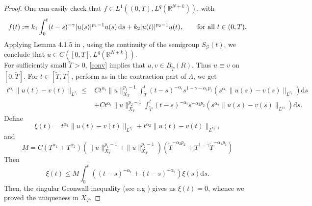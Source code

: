 \documentclass[a4,psfig,english,12pt,epsf,portrait]{article}
\numberwithin{equation}{section}
\def\R{{\mathbb {R}}}
\newcommand{\abs}[1]{\lvert#1\rvert}
\def\R{\mathbb{R}}
\begin{document}
\begin{proof}
	
	 One can easily check that $f\in L^1((0,T),L^q(\R^{N+k}))$, with
	$$f(t):=k_1 \int_0^t(t-s)^{-\gamma}\abs{u(s)}^{p_1-1}u(s) \, \mathrm{d}s  + k_2 |u(t)|^{p_2-1}u(t),\qquad \hbox{for all}\,\,t\in (0,T).$$
	Applying Lemma 4.1.5 in \cite{Caz-Hau-98}, using the continuity of the semigroup $S_{\mathcal{G}}(t)$,  we conclude that $u\in C([0,T],L^q(\R^{N+k}))$.\\
	
	 For sufficiently small $\tilde{T}>0$, \eqref{conv} implies that $u,v\in B_{\tilde{T}}(R)$. Thus $u\equiv v$ on $[0,\tilde{T}]$. For $t\in[\tilde{T},T]$, perform as in the contraction part of $\Lambda$, we get
		\begin{align*}
			t^{\alpha_i}\|u(t)-v(t)\|_{L^{r_i}} 
			\leq & C t^{\alpha_i} \|u\|_{X_T}^{p_1-1} \int_{\tilde{T}}^{t} (t-s)^{-\alpha_i} s^{1-\gamma-\alpha_1 p_1} \left(s^{\alpha_1} \|u(s) - v(s)\|_{L^{r_1}}\right) \mathrm{d}s \\
			& + C t^{\alpha_i} \|u\|_{X_T}^{p_2-1} \int_{\tilde{T}}^{t} (t-s)^{-\alpha_i}s^{-\alpha_2 p_2} \left(s^{\alpha_2} \|u(s) - v(s)\|_{L^{r_2}}\right) \mathrm{d}s    .
		\end{align*}
		Define
		$$\xi(t) = t^{\alpha_1} \|u(t) - v(t)\|_{L^{r_1}} +t^{\alpha_2} \|u(t) - v(t)\|_{L^{r_2}},$$
		and
		$$M=C (T^{\alpha_1}+T^{\alpha_2}) \left(  \|u\|_{X_T}^{p_1-1} + \|u\|_{X_T}^{p_2-1}\right) \left(\tilde{T}^{-\alpha_2 p_2} + T^{1-\gamma}\tilde{T}^{-\alpha_1 p_1}\right) $$
		Then
		$$\xi(t) \leq M  \int_{0}^{t} ((t-s)^{-\alpha_1}+(t-s)^{-\alpha_2})  \xi(s) \mathrm{d}s .$$
		Then, the singular Gronwall inequality (see e.g \cite[Lemma~3.3]{Amann-84}) gives us $\xi(t)=0$, whence we proved the uniqueness in $X_T$.
	
	
	

\end{proof}
\end{document}
